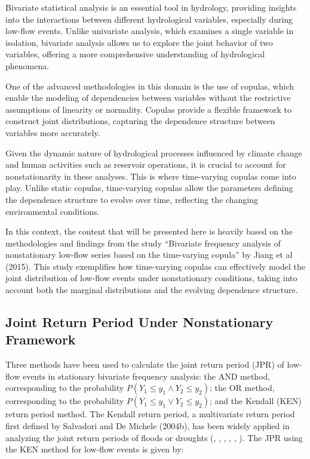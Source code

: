 \documentclass[
]{krantz}
\begin{document}
Bivariate statistical analysis is an essential tool in hydrology, providing insights into the interactions between different hydrological variables, especially during low-flow events. Unlike univariate analysis, which examines a single variable in isolation, bivariate analysis allows us to explore the joint behavior of two variables, offering a more comprehensive understanding of hydrological phenomena.

One of the advanced methodologies in this domain is the use of copulas, which enable the modeling of dependencies between variables without the restrictive assumptions of linearity or normality. Copulas provide a flexible framework to construct joint distributions, capturing the dependence structure between variables more accurately.

Given the dynamic nature of hydrological processes influenced by climate change and human activities such as reservoir operations, it is crucial to account for nonstationarity in these analyses. This is where time-varying copulas come into play. Unlike static copulas, time-varying copulas allow the parameters defining the dependence structure to evolve over time, reflecting the changing environmental conditions.

In this context, the content that will be presented here is heavily based on the methodologies and findings from the study ``Bivariate frequency analysis of nonstationary low-flow series based on the time-varying copula'' by Jiang et al (2015). This study exemplifies how time-varying copulas can effectively model the joint distribution of low-flow events under nonstationary conditions, taking into account both the marginal distributions and the evolving dependence structure.

\subsection{Joint Return Period Under Nonstationary Framework}\label{joint-return-period-under-nonstationary-framework}

Three methods have been used to calculate the joint return period (JPR) of low-flow events in stationary bivariate frequency analysis: the AND method, corresponding to the probability \(P(Y_{1} \leq y_{1} \wedge Y_{2} \leq y_{2})\); the OR method, corresponding to the probability \(P(Y_{1} \leq y_{1} \vee Y_{2} \leq y_{2})\); and the Kendall (KEN) return period method. The Kendall return period, a multivariate return period first defined by Salvadori and De Michele (2004b), has been widely applied in analyzing the joint return periods of floods or droughts (\citet{Salvadori2007}, \citet{Salvadori2010}, \citet{Salvadori2011}, \citet{DeMichele2013}, \citet{Graler2013}, \citet{Salvadori2013}). The JPR using the KEN method for low-flow events is given by:
\end{document}
